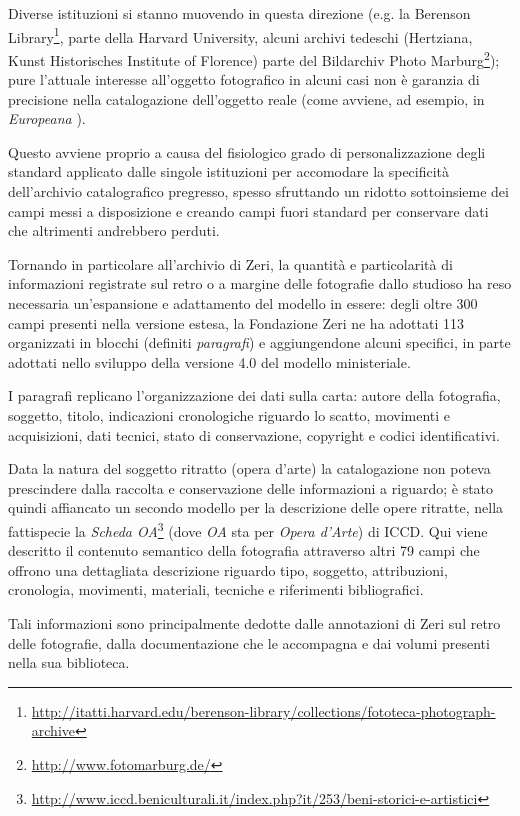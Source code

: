 Diverse istituzioni si stanno muovendo in questa direzione (e.g. la Berenson Library\footnote{\url{http://itatti.harvard.edu/berenson-library/collections/fototeca-photograph-archive}}, parte della Harvard University, alcuni archivi tedeschi (Hertziana, Kunst Historisches Institute of Florence) parte del Bildarchiv Photo Marburg\footnote{\url{http://www.fotomarburg.de/}}); pure l'attuale interesse all'oggetto fotografico in alcuni casi non è garanzia di precisione nella catalogazione dell'oggetto reale (come avviene, ad esempio, in \emph{Europeana} \cite{8}).

Questo avviene proprio a causa del fisiologico grado di personalizzazione degli standard applicato dalle singole istituzioni per accomodare la specificità dell'archivio catalografico pregresso, spesso sfruttando un ridotto sottoinsieme dei campi messi a disposizione e creando campi fuori standard per conservare dati che altrimenti andrebbero perduti.

Tornando in particolare all'archivio di Zeri, la quantità e particolarità di informazioni registrate sul retro o a margine delle fotografie dallo studioso ha reso necessaria un'espansione e adattamento del modello in essere: degli oltre 300 campi presenti nella versione estesa, la Fondazione Zeri ne ha adottati 113 organizzati in blocchi (definiti \emph{paragrafi}) e aggiungendone alcuni specifici, in parte adottati nello sviluppo della versione 4.0 del modello ministeriale.

I paragrafi replicano l'organizzazione dei dati sulla carta: autore della fotografia, soggetto, titolo, indicazioni cronologiche riguardo lo scatto, movimenti e acquisizioni, dati tecnici, stato di conservazione, copyright e codici identificativi.

Data la natura del soggetto ritratto (opera d'arte) la catalogazione non poteva prescindere dalla raccolta e conservazione delle informazioni a riguardo; è stato quindi affiancato un secondo modello per la descrizione delle opere ritratte, nella fattispecie la \emph{Scheda OA}\footnote{\url{http://www.iccd.beniculturali.it/index.php?it/253/beni-storici-e-artistici}} (dove \emph{OA} sta per \emph{Opera d'Arte}) di ICCD. Qui viene descritto il contenuto semantico della fotografia attraverso altri 79 campi che offrono una dettagliata descrizione riguardo tipo, soggetto, attribuzioni, cronologia, movimenti, materiali, tecniche e riferimenti bibliografici.

Tali informazioni sono principalmente dedotte dalle annotazioni di Zeri sul retro delle fotografie, dalla documentazione che le accompagna e dai volumi presenti nella sua biblioteca.

